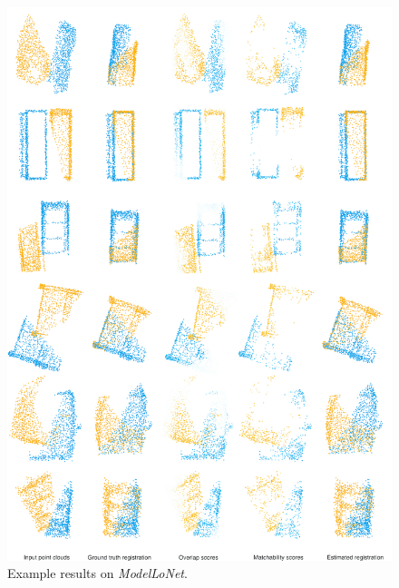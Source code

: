 \begin{figure}[t]
    \centering
    \includegraphics[width=0.87\columnwidth]{figures/images/modelnet_supp.jpg}
    \caption{Example results on \emph{ModelLoNet}.}
    \label{fig:modelnet_supp}
    
\end{figure}